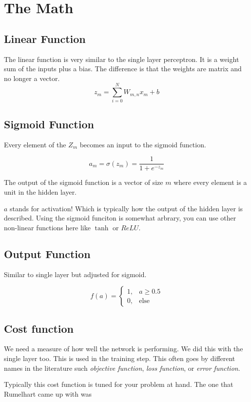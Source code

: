 \documentclass[letterpaper,12pt]{article}
\begin{document}
\section{The Math}

\subsection{Linear Function}
The linear function is very similar to the single layer perceptron. It is a
weight sum of the inputs plus a bias. The difference is that the weights are
matrix and no longer a vector.
\[
    z_m = \sum_{i=0}^{N} W_{m,n} x_m + b
\]

\subsection{Sigmoid Function}
Every element of the $Z_m$ becomes an input to the sigmoid function.

\[
    a_m = \sigma(z_m) = \frac{1}{1 + e^{-z_m}}
\]

The output of the sigmoid function is a vector of size $m$ where every element
is a unit in the hidden layer.

$a$ stands for activation! Which is typically how the output of the hidden layer
is described. Using the sigmoid funciton is somewhat arbrary, you can use other
non-linear functions here like $\tanh$ or $ReLU$.

\subsection{Output Function}

Similar to single layer but adjusted for sigmoid.

\[
    f(a) =
    \begin{cases}
        1, & a \ge 0.5\\
        0, & \text{else}
    \end{cases}
\]

\subsection{Cost function}

We need a measure of how well the network is performing. We did this with the
single layer too. This is used in the training step. This often goes by
different names in the literature such \emph{objective function}, \emph{loss
function}, or \emph{error function}.

Typically this cost function is tuned for your problem at hand. The one that
Rumelhart came up with was
\end{document}
